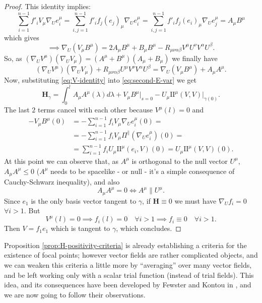 \begin{proof}
	This identity implies:
	\[
	\sum_{i = 1}^{n - 1}f'_iV_{\mu}\nabla_Ue_i^{\mu} = \sum_{i, j = 1}^{n - 1}f'_if_j(e_j)_{\mu}\nabla_Ue_i^{\mu} = \sum_{i, j = 1}^{n - 1}f'_if_j(e_i)_{\mu}\nabla_Ue_j^{\mu} = A_{\mu}B^{\mu}
	\]
	which gives
	\[
	\implies \nabla_U(V_{\mu}B^{\mu}) = 2A_{\mu}B^{\mu} + B_{\mu}B^{\mu} - R_{\mu\nu\alpha\beta}V^{\mu}U^{\nu}V^{\alpha}U^{\beta}.
	\]
	So, as \((\nabla_UV^{\mu})(\nabla_UV_{\mu}) = (A^{\mu} + B^{\mu}) (A_{\mu} + B_{\mu})\) we finally have
	\begin{equation}
	\label{eq:V-identity}
		(\nabla_UV^{\mu})(\nabla_UV_{\mu}) + R_{\mu\nu\alpha\beta}U^{\mu}V^{\nu}V^{\alpha}U^{\beta} =  \nabla_U(V_{\mu}B^{\mu})  + A_{\mu}A^{\mu}.
	\end{equation}
	Now, substituting \eqref{eq:V-identity} into \eqref{eq:second-E-var} we get
	\[
	\textbf{H}_{\gamma} = \int_{0}^{l} A_{\mu}A^{\mu}(\lambda) d\lambda + V_{\mu}B^{\mu}\Big\vert_{s = 0} - U_{\mu}\mathrm{I\!I}^{\mu}(V, V)\vert_{\gamma(0)}.
	\]
	The last \(2\) terms cancel with each other because \(V^{\mu}(l) = 0\) and 
	\begin{align*}
		-V_{\mu}B^{\mu}(0) &= - \sum_{i = 1}^{n - 1}f_i V_{\mu}\nabla_Ue_i^{\mu}(0) =\\
		& = - \sum_{i = 1}^{n - 1}f_i V_{\mu}\Pi^{\parallel}\left(\nabla_Ue_i^{\mu}\right)(0) =\\
		& = \sum_{i = 1}^{n - 1}f_i U_{\mu}\mathrm{I\!I}^{\mu}(e_i, V)(0) = U_{\mu}\mathrm{I\!I}^{\mu}(V, V)(0).
	\end{align*}
	At this point we can observe that, as \(A^{\mu}\) is orthogonal to the null vector \(U^{\mu}\), \(A_{\mu}A^{\mu} \le 0\) (\(A^{\mu}\) needs to be spacelike - or null - it's a simple consequence of Cauchy-Schwarz inequality), and also
	\[
	A_{\mu}A^{\mu} = 0 \iff A^{\mu}\parallel U^{\mu}.
	\]
	Since \(e_1\) is the only basis vector tangent to \(\gamma\), if \(\textbf{H} \equiv 0\) we must have \(\nabla_Uf_i = 0\) \(\forall i > 1\). But
	\[
	V^{\mu}(l) = 0 \implies f_i(l) = 0 \quad \forall i > 1 \implies f_i\equiv 0 \quad \forall i > 1.
	\]
	Then \(V = f_1e_1\) which is tangent to \(\gamma\), which concludes.
\end{proof}

Proposition \ref{prop:H-positivity-criteria} is already establishing a criteria for the existence of focal points; however vector fields are rather complicated objects, and we can weaken this criteria a little more by ``averaging'' over many vector fields, and be left working only with a scalar trial function (instead of trial fields). This idea, and its consequences have been developed by Fewster and Kontou in \cite{fewster2020new}, and we are now going to follow their observations.

